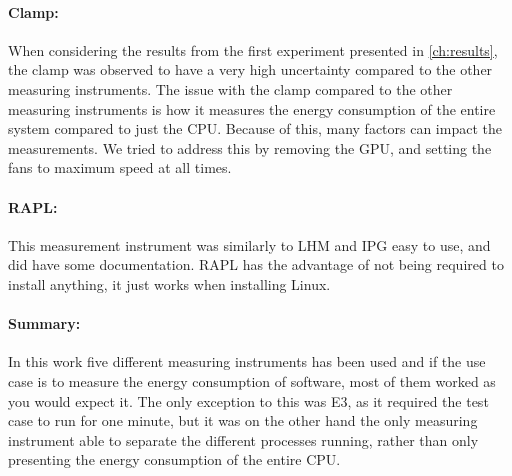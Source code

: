 \paragraph*{Clamp:} When considering the results from the first experiment presented in \cref{ch:results}, the clamp was observed to have a very high uncertainty compared to the other measuring instruments. The issue with the clamp compared to the other measuring instruments is how it measures the energy consumption of the entire system compared to just the CPU. Because of this, many factors can impact the measurements. We tried to address this by removing the GPU, and setting the fans to maximum speed at all times.


\paragraph*{RAPL:} This measurement instrument was similarly to LHM and IPG easy to use, and did have some documentation. RAPL has the advantage of not being required to install anything, it just works when installing Linux.

\paragraph*{Summary:} In this work five different measuring instruments has been used and if the use case is to measure the energy consumption of software, most of them worked as you would expect it. The only exception to this was E3, as it required the test case to run for one minute, but it was on the other hand the only measuring instrument able to separate the different processes running, rather than only presenting the energy consumption of the entire CPU. 